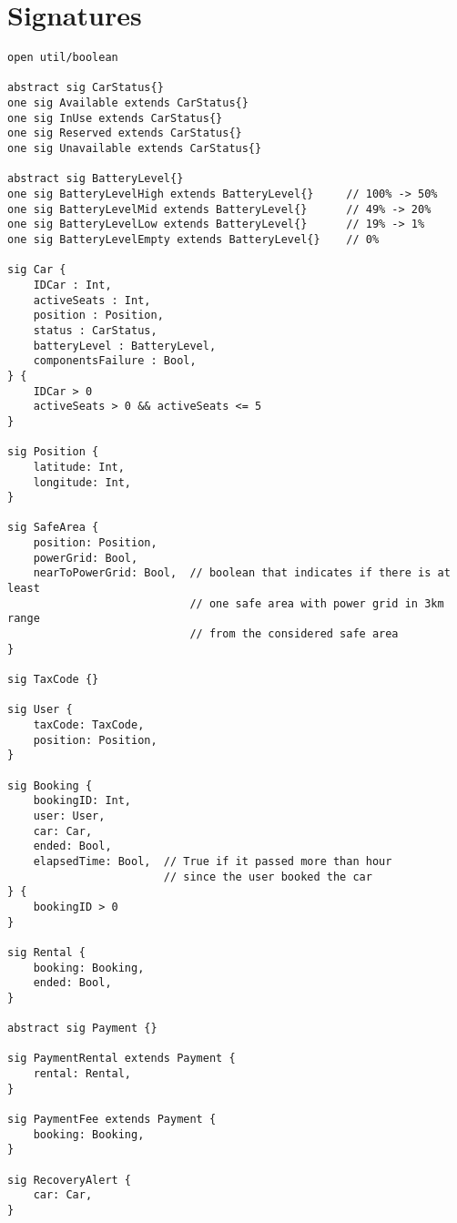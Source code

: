 \section{Signatures}

\lstset{language=alloy}

\begin{lstlisting}
open util/boolean

abstract sig CarStatus{}
one sig Available extends CarStatus{}
one sig InUse extends CarStatus{}
one sig Reserved extends CarStatus{}
one sig Unavailable extends CarStatus{}

abstract sig BatteryLevel{}
one sig BatteryLevelHigh extends BatteryLevel{}		// 100% -> 50%
one sig BatteryLevelMid extends BatteryLevel{}		// 49% -> 20%
one sig BatteryLevelLow extends BatteryLevel{}		// 19% -> 1%
one sig BatteryLevelEmpty extends BatteryLevel{}	// 0%

sig Car {
	IDCar : Int,
	activeSeats : Int,
	position : Position,
	status : CarStatus,
	batteryLevel : BatteryLevel,
	componentsFailure : Bool,
} {
	IDCar > 0
	activeSeats > 0 && activeSeats <= 5
}

sig Position {
	latitude: Int,
	longitude: Int,
}

sig SafeArea {
	position: Position,
	powerGrid: Bool,
	nearToPowerGrid: Bool,	// boolean that indicates if there is at least
							// one safe area with power grid in 3km range
							// from the considered safe area
}

sig TaxCode {}

sig User {
	taxCode: TaxCode,
	position: Position,
}

sig Booking {
	bookingID: Int,
	user: User,
	car: Car,
	ended: Bool,
	elapsedTime: Bool,	// True if it passed more than hour
						// since the user booked the car
} {
	bookingID > 0
}

sig Rental {
	booking: Booking,
	ended: Bool,
} 

abstract sig Payment {}

sig PaymentRental extends Payment {
	rental: Rental,
}

sig PaymentFee extends Payment {
	booking: Booking,
}

sig RecoveryAlert {
	car: Car,
}
\end{lstlisting}